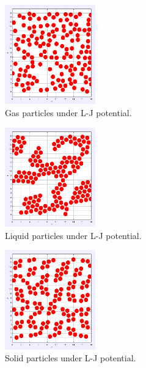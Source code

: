 \documentclass[12pt,a4paper,twocolumn]{article}
\begin{document}
\begin{figure}[htb]
	\centering
	\includegraphics[width=0.35\textwidth]{gas.png}
	\caption{Gas particles under L-J potential.}
	\label{fig:gas}
\end{figure}

\begin{figure}[htb]
	\centering
	\includegraphics[width=0.35\textwidth]{liquid.png}
	\caption{Liquid particles under L-J potential.}
	\label{fig:liquid}
\end{figure}

\begin{figure}[htb]
	\centering
	\includegraphics[width=0.35\textwidth]{solid.png}
	\caption{Solid particles under L-J potential.}
	\label{fig:solid}
\end{figure}
\end{document}

